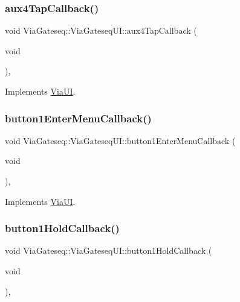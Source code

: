 \subsubsection{\texorpdfstring{aux4\+Tap\+Callback()}{aux4TapCallback()}}
{\footnotesize\ttfamily void Via\+Gateseq\+::\+Via\+Gateseq\+U\+I\+::aux4\+Tap\+Callback (\begin{DoxyParamCaption}\item[{void}]{ }\end{DoxyParamCaption})\hspace{0.3cm}{\ttfamily [override]}, {\ttfamily [virtual]}}



Implements \mbox{\hyperlink{class_via_u_i_a0a43c527f027d11b266080d8cacb1d65}{Via\+UI}}.

\mbox{\label{class_via_gateseq_1_1_via_gateseq_u_i_aa4ce0e46aeda7bea4ec2a09bbca2abac}} 
\subsubsection{\texorpdfstring{button1\+Enter\+Menu\+Callback()}{button1EnterMenuCallback()}}
{\footnotesize\ttfamily void Via\+Gateseq\+::\+Via\+Gateseq\+U\+I\+::button1\+Enter\+Menu\+Callback (\begin{DoxyParamCaption}\item[{void}]{ }\end{DoxyParamCaption})\hspace{0.3cm}{\ttfamily [override]}, {\ttfamily [virtual]}}



Implements \mbox{\hyperlink{class_via_u_i_ae00249c10af94437c357222328a56f82}{Via\+UI}}.

\mbox{\label{class_via_gateseq_1_1_via_gateseq_u_i_a4123b11e47b7dc36bba9041fa3635e84}} 
\subsubsection{\texorpdfstring{button1\+Hold\+Callback()}{button1HoldCallback()}}
{\footnotesize\ttfamily void Via\+Gateseq\+::\+Via\+Gateseq\+U\+I\+::button1\+Hold\+Callback (\begin{DoxyParamCaption}\item[{void}]{ }\end{DoxyParamCaption})\hspace{0.3cm}{\ttfamily [override]}, {\ttfamily [virtual]}}



